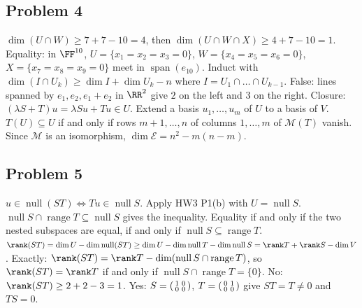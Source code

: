 \documentclass[11pt]{scrartcl}
\DeclareMathOperator{\nul}{null}
\DeclareMathOperator{\range}{range}
\DeclareMathOperator{\spn}{span}
\newcommand{\MM}{\mathcal M}
\begin{document}
\subsection*{Problem 4}
\begin{enumerate}[(a)]
  \ii $\dim(U\cap W)\ge7+7-10=4$, then $\dim(U\cap W\cap X)\ge4+7-10=1$.
  Equality: in $\FF^{10}$, $U=\{x_1=x_2=x_3=0\}$, $W=\{x_4=x_5=x_6=0\}$, $X=\{x_7=x_8=x_9=0\}$ meet in $\spn(e_{10})$.
  \ii Induct with $\dim(I\cap U_k)\ge\dim I+\dim U_k-n$ where $I=U_1\cap\dots\cap U_{k-1}$.
  \ii False: lines spanned by $e_1,e_2,e_1+e_2$ in $\RR^2$ give $2$ on the left and $3$ on the right.
  \ii Closure: $(\lambda S+T)u=\lambda Su+Tu\in U$.
  Extend a basis $u_1,\dots,u_m$ of $U$ to a basis of $V$.
  $T(U)\subseteq U$ if and only if rows $m+1,\dots,n$ of columns $1,\dots,m$ of $\MM(T)$ vanish.
  Since $\MM$ is an isomorphism, $\dim\mathcal E=n^2-m(n-m)$.
\end{enumerate}

\subsection*{Problem 5}
\begin{enumerate}[(a)]
  \ii $u\in\nul(ST)\iff Tu\in\nul S$. Apply HW3 P1(b) with $U=\nul S$.
  \ii $\nul S\cap\range T\subseteq\nul S$ gives the inequality.
  Equality if and only if the two nested subspaces are equal, if and only if $\nul S\subseteq\range T$.
  \ii $\rank(ST)=\dim U-\dim\nul(ST)\ge\dim U-\dim\nul T-\dim\nul S=\rank T+\rank S-\dim V$.
  Exactly: $\rank(ST)=\rank T-\dim(\nul S\cap\range T)$, so $\rank(ST)=\rank T$ if and only if $\nul S\cap\range T=\{0\}$.
  \ii No: $\rank(ST)\ge2+2-3=1$.
  Yes: $S=\begin{psmallmatrix}1&0\\0&0\end{psmallmatrix}$, $T=\begin{psmallmatrix}0&1\\0&0\end{psmallmatrix}$ give $ST=T\ne0$ and $TS=0$.
\end{enumerate}
\end{document}
